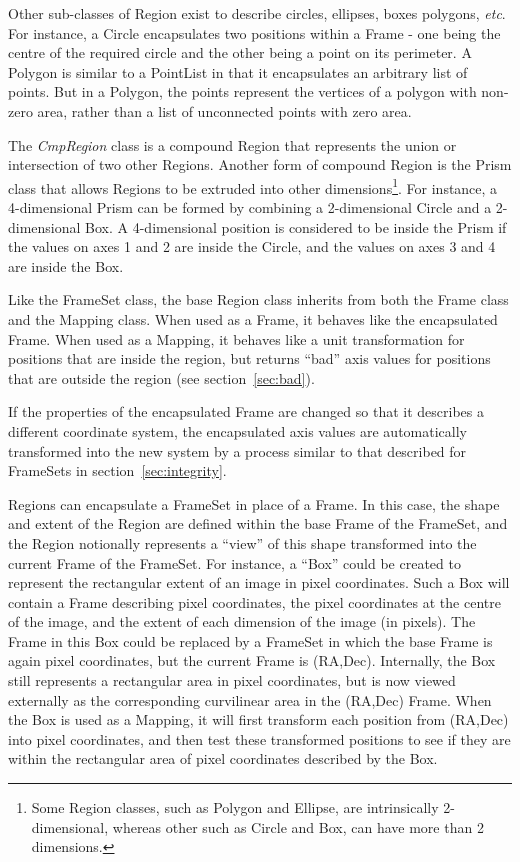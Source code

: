 \documentclass[final,authoryear,5p,times,twocolumn]{elsarticle}
\begin{document}
Other sub-classes of Region exist to describe circles, ellipses, boxes
polygons, \emph{etc}. For instance, a Circle encapsulates two positions
within a Frame - one being the centre of the required circle and the
other being a point on its perimeter. A Polygon is similar to a PointList
in that it encapsulates an arbitrary list of points. But in a Polygon,
the points represent the vertices of a polygon with non-zero area, rather
than a list of unconnected points with zero area.

The \emph{CmpRegion} class is a compound Region that represents the
union or intersection of two other Regions.  Another form of compound
Region is the Prism class that allows Regions to be extruded into other
dimensions\footnote{Some Region classes, such as Polygon and Ellipse, are
intrinsically 2-dimensional, whereas other such as Circle and Box, can
have more than 2 dimensions.}. For instance, a 4-dimensional Prism can be
formed by combining a 2-dimensional Circle and a 2-dimensional Box. A
4-dimensional position is considered to be inside the Prism if the values
on axes 1 and 2 are inside the Circle, and the values on axes 3 and 4 are
inside the Box.

Like the FrameSet class, the base Region class inherits from both the
Frame class and the Mapping class. When used as a Frame, it behaves like
the encapsulated Frame. When used as a Mapping, it behaves like a unit
transformation for positions that are inside the region, but returns
``bad'' axis values for positions that are outside the region (see
section~\ref{sec:bad}).

If the properties of the encapsulated Frame are changed so that it
describes a different coordinate system, the encapsulated axis values are
automatically transformed into the new system by a process similar to
that described for FrameSets in section~\ref{sec:integrity}.

Regions can encapsulate a FrameSet in place of a Frame. In this case, the
shape and extent of the Region are defined within the base Frame of the
FrameSet, and the Region notionally represents a ``view'' of this shape
transformed into the current Frame of the FrameSet. For instance, a
``Box'' could be created to represent the rectangular extent of an image
in pixel coordinates. Such a Box will contain a Frame describing pixel
coordinates, the pixel coordinates at the centre of the image, and the
extent of each dimension of the image (in pixels). The Frame in this Box
could be replaced by a FrameSet in which the base Frame is again pixel
coordinates, but the current Frame is (RA,Dec). Internally, the Box still
represents a rectangular area in pixel coordinates, but is now viewed
externally as the corresponding curvilinear area in the (RA,Dec) Frame.
When the Box is used as a Mapping, it will first transform each position
from (RA,Dec) into pixel coordinates, and then test these transformed
positions to see if they are within the rectangular area of pixel
coordinates described by the Box.
\end{document}
